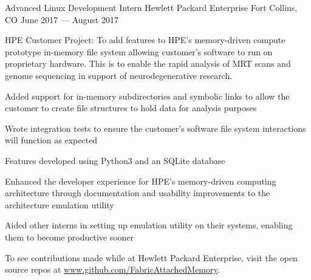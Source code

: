 \begin{cventries}
  \cventry
    {Advanced Linux Development Intern} %
    {Hewlett Packard Enterprise} %
    {Fort Collins, CO} %
    {June 2017 --- August 2017} %
    {
      \begin{cvitems} %
        \item {HPE Customer Project:  To add features to HPE’s memory-driven compute prototype in-memory file system allowing customer’s software to run on proprietary hardware. This is to enable the rapid analysis of MRT scans and genome sequencing in support of neurodegenerative research.}
        \item {Added support for in-memory subdirectories and symbolic links to allow the customer to create file structures to hold data for analysis purposes}
        \item {Wrote integration tests to ensure the customer's software file system interactions will function as expected}
        \item {Features developed using Python3 and an SQLite database}
        \item {Enhanced the developer experience for HPE's memory-driven computing architecture through documentation and usability improvements to the architecture emulation utility}
        \item {Aided other interns in setting up emulation utility on their systems, enabling them to become productive sooner}
        \item {To see contributions made while at Hewlett Packard Enterprise, visit the open source repos at \url{www.github.com/FabricAttachedMemory}.} 
      \end{cvitems}
    }



\end{cventries}
